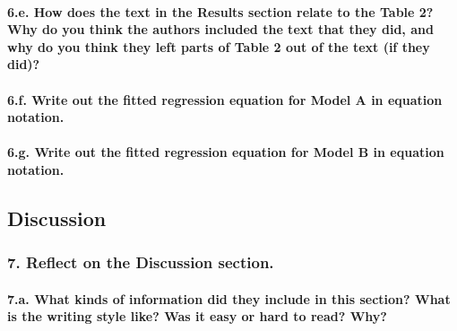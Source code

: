 \documentclass[]{article}
\let\oldparagraph\paragraph
\renewcommand{\paragraph}[1]{\oldparagraph{#1}\mbox{}}
\begin{document}
\hypertarget{e.-how-does-the-text-in-the-results-section-relate-to-the-table-2-why-do-you-think-the-authors-included-the-text-that-they-did-and-why-do-you-think-they-left-parts-of-table-2-out-of-the-text-if-they-did}{%
\paragraph{6.e. How does the text in the Results section relate to the
Table 2? Why do you think the authors included the text that they did,
and why do you think they left parts of Table 2 out of the text (if they
did)?}\label{e.-how-does-the-text-in-the-results-section-relate-to-the-table-2-why-do-you-think-the-authors-included-the-text-that-they-did-and-why-do-you-think-they-left-parts-of-table-2-out-of-the-text-if-they-did}}

\hypertarget{f.-write-out-the-fitted-regression-equation-for-model-a-in-equation-notation.}{%
\paragraph{6.f. Write out the fitted regression equation for Model A in
equation
notation.}\label{f.-write-out-the-fitted-regression-equation-for-model-a-in-equation-notation.}}

\hypertarget{g.-write-out-the-fitted-regression-equation-for-model-b-in-equation-notation.}{%
\paragraph{6.g. Write out the fitted regression equation for Model B in
equation
notation.}\label{g.-write-out-the-fitted-regression-equation-for-model-b-in-equation-notation.}}

\hypertarget{discussion}{%
\subsection{Discussion}\label{discussion}}

\hypertarget{reflect-on-the-discussion-section.}{%
\subsubsection{\texorpdfstring{7. Reflect on the \textbf{Discussion}
section.}{7. Reflect on the Discussion section.}}\label{reflect-on-the-discussion-section.}}

\hypertarget{a.-what-kinds-of-information-did-they-include-in-this-section-what-is-the-writing-style-like-was-it-easy-or-hard-to-read-why-1}{%
\paragraph{7.a. What kinds of information did they include in this
section? What is the writing style like? Was it easy or hard to read?
Why?}\label{a.-what-kinds-of-information-did-they-include-in-this-section-what-is-the-writing-style-like-was-it-easy-or-hard-to-read-why-1}}
\end{document}
